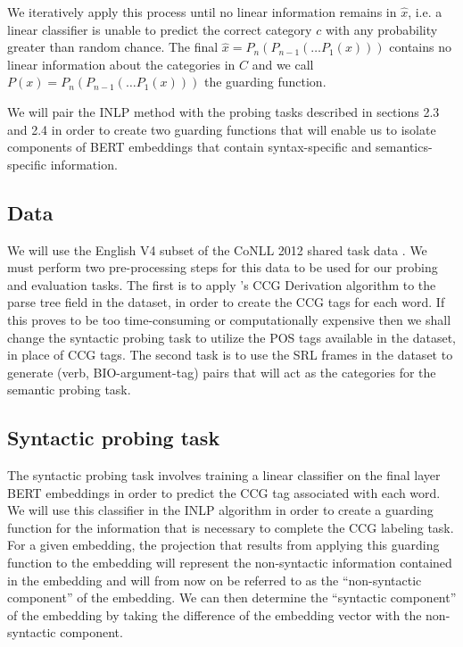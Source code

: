\documentclass[11pt,a4paper]{article}
\begin{document}
We iteratively apply this process until no linear information remains in $\hat{x}$, i.e. a linear classifier is unable to predict the correct category $c$ with any probability greater than random chance. The final $\hat{x} = P_n(P_{n-1}(\dots P_1(x)))$ contains no linear information about the categories in $C$ and we call $P(x) = P_n(P_{n-1}(\dots P_1(x)))$ the guarding function. 

We will pair the INLP method with the probing tasks described in sections 2.3 and 2.4 in order to create two guarding functions that will enable us to isolate components of BERT embeddings that contain syntax-specific and semantics-specific information. 

\subsection{Data}

We will use the English V4 subset of the CoNLL 2012 shared task data\citep{2012-conll} . We must perform two pre-processing steps for this data to be used for our probing and evaluation tasks. The first is to apply \citet{ccg-bank}'s CCG Derivation algorithm to the parse tree field in the dataset, in order to create the CCG tags for each word. If this proves to be too time-consuming or computationally expensive then we shall change the syntactic probing task to utilize the POS tags available in the dataset, in place of CCG tags. The second task is to use the SRL frames in the dataset to generate (verb, BIO-argument-tag) pairs that will act as the categories for the semantic probing task. 

\subsection{Syntactic probing task}

The syntactic probing task involves training a linear classifier on the final layer BERT embeddings in order to predict the CCG tag associated with each word. We will use this classifier in the INLP algorithm in order to create a guarding function for the information that is necessary to complete the CCG labeling task. For a given embedding, the projection that results from applying this guarding function to the embedding will represent the non-syntactic information contained in the embedding and will from now on be referred to as the ``non-syntactic component'' of the embedding. We can then determine the ``syntactic component'' of the embedding by taking the difference of the embedding vector with the non-syntactic component. 
\end{document}
